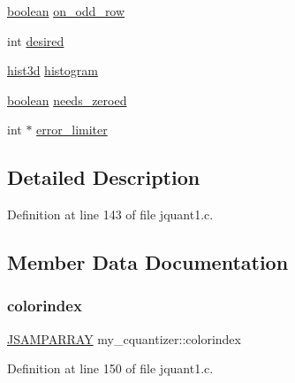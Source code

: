 \begin{DoxyCompactItemize}
\item 
\mbox{\hyperlink{jmorecfg_8h_a7c6368b321bd9acd0149b030bb8275ed}{boolean}} \mbox{\hyperlink{structmy__cquantizer_a7745a27202b6a562461aa19ecf74638d}{on\+\_\+odd\+\_\+row}}
\item 
int \mbox{\hyperlink{structmy__cquantizer_aa960fa399af744fcdbf9c07ab9bd956e}{desired}}
\item 
\mbox{\hyperlink{jquant2_8c_ada1687f0231a8711298a8e4741e82c16}{hist3d}} \mbox{\hyperlink{structmy__cquantizer_a108a22411249dc52d196fa5a1ee50173}{histogram}}
\item 
\mbox{\hyperlink{jmorecfg_8h_a7c6368b321bd9acd0149b030bb8275ed}{boolean}} \mbox{\hyperlink{structmy__cquantizer_a06c9d37b470ec1e88502a32a5a73b12c}{needs\+\_\+zeroed}}
\item 
int $\ast$ \mbox{\hyperlink{structmy__cquantizer_a2af4df34ba2e1a9081f0dc3a661066e7}{error\+\_\+limiter}}
\end{DoxyCompactItemize}


\subsection{Detailed Description}


Definition at line 143 of file jquant1.\+c.



\subsection{Member Data Documentation}
\mbox{\label{structmy__cquantizer_a7ec499ccdb9c6983c14edc40453ac1ed}} 
\subsubsection{\texorpdfstring{colorindex}{colorindex}}
{\footnotesize\ttfamily \mbox{\hyperlink{jpeglib_8h_ac9d5d1b829ed51769db69a37271a7e91}{J\+S\+A\+M\+P\+A\+R\+R\+AY}} my\+\_\+cquantizer\+::colorindex}



Definition at line 150 of file jquant1.\+c.

\mbox{\label{structmy__cquantizer_aa960fa399af744fcdbf9c07ab9bd956e}} 
